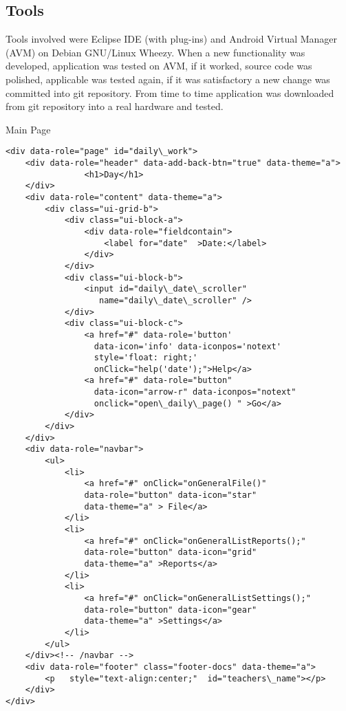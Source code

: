   
		\subsection{Tools}
	
	Tools involved were Eclipse IDE (with plug-ins) and Android Virtual Manager (AVM) on Debian GNU/Linux Wheezy. When a new functionality was developed, application was tested on AVM,  if it worked, source code was polished, applicable was tested again, if it was satisfactory a new change was committed into git repository. From time to time application was downloaded from git repository into a real hardware and tested. 
	
\begin{bclogo}[couleur=blue!30,arrondi=0.1, logo=\bcpanchant, barre=zigzag,  ombre=true ] 
{Main Page}
\begin{verbatim}
<div data-role="page" id="daily\_work">
    <div data-role="header" data-add-back-btn="true" data-theme="a">
                <h1>Day</h1>
    </div>
    <div data-role="content" data-theme="a">
        <div class="ui-grid-b">
            <div class="ui-block-a">
                <div data-role="fieldcontain">
                    <label for="date"  >Date:</label>
                </div>
            </div>
            <div class="ui-block-b">
                <input id="daily\_date\_scroller"
                   name="daily\_date\_scroller" />
            </div>
            <div class="ui-block-c">
                <a href="#" data-role='button' 
                  data-icon='info' data-iconpos='notext' 
                  style='float: right;' 
                  onClick="help('date');">Help</a>
                <a href="#" data-role="button" 
                  data-icon="arrow-r" data-iconpos="notext"  
                  onclick="open\_daily\_page() " >Go</a>
            </div>
        </div>
    </div>
    <div data-role="navbar">
        <ul>
            <li>
                <a href="#" onClick="onGeneralFile()"  
                data-role="button" data-icon="star"  
                data-theme="a" > File</a>
            </li>
            <li>
                <a href="#" onClick="onGeneralListReports();"  
                data-role="button" data-icon="grid"  
                data-theme="a" >Reports</a>
            </li>
            <li>
                <a href="#" onClick="onGeneralListSettings();" 
                data-role="button" data-icon="gear"   
                data-theme="a" >Settings</a>
            </li>
        </ul>
    </div><!-- /navbar -->
    <div data-role="footer" class="footer-docs" data-theme="a">
        <p   style="text-align:center;"  id="teachers\_name"></p>
    </div>
</div> 
\end{verbatim}

\end{bclogo}

